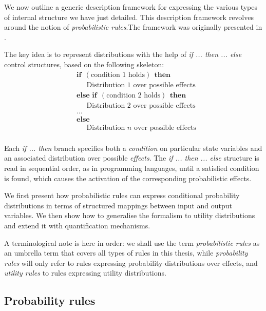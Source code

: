 We now outline a generic description framework for expressing the various types of internal structure we have just detailed.  This description framework revolves around the notion of \textit{probabilistic rules}.The framework was originally presented in \cite{rulebasedmodels-sigdial2012,lison-semdial2012}.

The key idea is to represent distributions with the help of \textit{if ... then ... else} control structures, based on the following skeleton:
\begin{equation*}
\begin{aligned}
& \textbf{if} \ \ (\text{condition 1 holds}) \ \ \textbf{then} \\ 
& \;\;\;\;\; \text{Distribution 1 over possible effects} \\
& \textbf{else if} \ \ (\text{condition 2 holds}) \ \ \textbf{then} \\ 
& \;\;\;\;\; \text{Distribution 2 over possible effects} \\
& ... \\
& \textbf{else} \\
& \;\;\;\;\; \text{Distribution } n \text{ over possible effects} \\ 
\end{aligned}
\label{eq:probrule}
\end{equation*}

Each \textit{if ... then} branch specifies both a \textit{condition} on particular state variables and an associated distribution over possible \textit{effects}.   The \textit{if ... then ... else} structure is read in sequential order, as in programming languages, until a satisfied condition is found, which causes the activation of the corresponding probabilistic effects. 

We first present how probabilistic rules can express conditional probability distributions in terms of structured mappings between input and output variables.  We then show how to  generalise the formalism to utility distributions and extend it with quantification mechanisms.

A terminological note is here in order: we shall use the term \textit{probabilistic rules} as an umbrella term that covers all types of rules in this thesis, while \textit{probability rules} will only refer to rules expressing probability distributions over effects, and \textit{utility rules} to rules expressing utility distributions.

\subsection{Probability rules}
\label{sec:probabirules}

